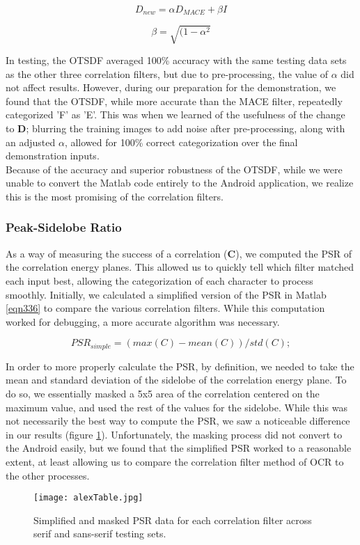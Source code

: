 \begin{equation}
\label{eqn3351}
D_{new} = \alpha D_{MACE} + \beta I
\end{equation}

\begin{equation}
\label{eqn3352}
\beta = \sqrt{(1 - \alpha^{2}}
\end{equation}

In testing, the OTSDF averaged 100\% accuracy with the same testing data sets as the other three correlation filters, but due to pre-processing, the value of $\alpha$ did not affect results. However, during our preparation for the demonstration, we found that the OTSDF, while more accurate than the MACE filter, repeatedly categorized 'F' as 'E'. This was when we learned of the usefulness of the change to \textbf{D}; blurring the training images to add noise after pre-processing, along with an adjusted $\alpha$, allowed for 100\% correct categorization over the final demonstration inputs. \\
Because of the accuracy and superior robustness of the OTSDF, while we were unable to convert the Matlab code entirely to the Android application, we realize this is the most promising of the correlation filters.

\subsubsection{Peak-Sidelobe Ratio}
As a way of measuring the success of a correlation (\textbf{C}), we computed the PSR of the correlation energy planes. This allowed us to quickly tell which filter matched each input best, allowing the categorization of each character to process smoothly. Initially, we calculated a simplified version of the PSR in Matlab \eqref{eqn336} to compare the various correlation filters. While this computation worked for debugging, a more accurate algorithm was necessary.

\begin{equation}
\label{eqn336}
PSR_{simple} = (max(C) - mean(C)) / std(C);
\end{equation}

In order to more properly calculate the PSR, by definition, we needed to take the mean and standard deviation of the sidelobe of the correlation energy plane. To do so, we essentially masked a 5x5 area of the correlation centered on the maximum value, and used the rest of the values for the sidelobe. While this was not necessarily the best way to compute the PSR, we saw a noticeable difference in our results (figure \ref{fig:alexTable}). Unfortunately, the masking process did not convert to the Android easily, but we found that the simplified PSR worked to a reasonable extent, at least allowing us to compare the correlation filter method of OCR to the other processes.

\begin{figure}[!]
		\texttt{[image: alexTable.jpg]}\\
		\caption{Simplified and masked PSR data for each correlation filter across serif and sans-serif testing sets.}
		\label{fig:alexTable}
\end{figure}